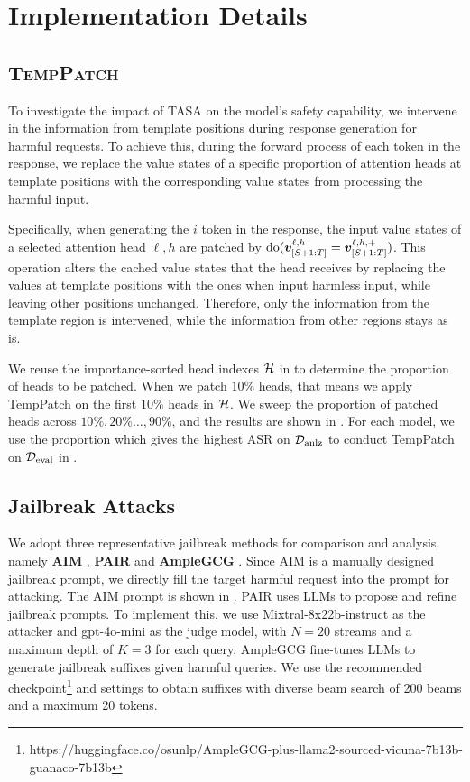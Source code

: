 \section{Implementation Details}


\subsection{\textsc{TempPatch}}
\label{appendix:temp_patch}

To investigate the impact of TASA on the model's safety capability, we intervene in the information from template positions during response generation for harmful requests. To achieve this, during the forward process of each token in the response, we replace the value states of a specific proportion of attention heads at template positions with the corresponding value states from processing the harmful input. 

Specifically, when generating the \(i\) token in the response, the input value states of a selected attention head \(\ell, h\) are patched by \(\text{do}({\bm{v}}_{[S+1:T]}^{\ell,h}={\bm{v}}_{[S+1:T]}^{\ell,h,+})\). This operation alters the cached value states that the head receives by replacing the values at template positions with the ones when input harmless input, while leaving other positions unchanged. Therefore, only the information from the template region is intervened, while the information from other regions stays as is.


We reuse the importance-sorted head indexes \({\mathcal{H}}\) in  to determine the proportion of heads to be patched.
When we patch \(10\%\) heads, that means we apply TempPatch on the first \(10\%\) heads in \({\mathcal{H}}\). We sweep the proportion of patched heads across \(10\%, 20\%\dots,90\% \), and the results are shown in . For each model, we use the proportion which gives the highest ASR on \({\mathcal{D}}_{\text{anlz}}\) to conduct TempPatch on \({\mathcal{D}}_{\text{eval}}\) in .

\subsection{Jailbreak Attacks}
\label{appendix:jb_details}


We adopt three representative jailbreak methods for comparison and analysis, namely \textbf{AIM} \cite{wei2023jailbroken}, \textbf{PAIR} \cite{chao2023jailbreaking} and \textbf{AmpleGCG} \cite{liao2024amplegcg}. Since AIM is a manually designed jailbreak prompt, we directly fill the target harmful request into the prompt for attacking. The AIM prompt is shown in . PAIR uses LLMs to propose and refine jailbreak prompts. To implement this, we use Mixtral-8x22b-instruct as the attacker and gpt-4o-mini as the judge model, with \(N=20\) streams and a maximum depth of \(K=3\) for each query.
AmpleGCG fine-tunes LLMs to generate jailbreak suffixes given harmful queries. We use the recommended checkpoint\footnote{https://huggingface.co/osunlp/AmpleGCG-plus-llama2-sourced-vicuna-7b13b-guanaco-7b13b} and settings to obtain suffixes with diverse beam search of 200 beams and a maximum 20 tokens.

